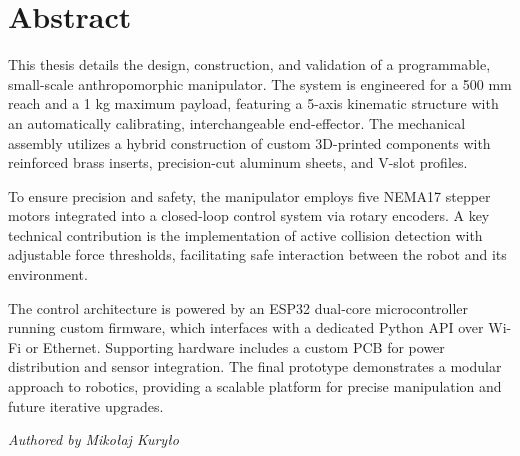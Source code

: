 \documentclass[10pt]{article}
\begin{document}
\section*{Abstract} %
This thesis details the design, construction, and validation of a programmable, small-scale anthropomorphic manipulator. The system is engineered for a 500 mm reach and a 1 kg maximum payload, featuring a 5-axis kinematic structure with an automatically calibrating, interchangeable end-effector. The mechanical assembly utilizes a hybrid construction of custom 3D-printed components with reinforced brass inserts, precision-cut aluminum sheets, and V-slot profiles.
\smallskip\par
To ensure precision and safety, the manipulator employs five NEMA17 stepper motors integrated into a closed-loop control system via rotary encoders. A key technical contribution is the implementation of active collision detection with adjustable force thresholds, facilitating safe interaction between the robot and its environment.
\smallskip\par
The control architecture is powered by an ESP32 dual-core microcontroller running custom firmware, which interfaces with a dedicated Python API over Wi-Fi or Ethernet. Supporting hardware includes a custom PCB for power distribution and sensor integration. The final prototype demonstrates a modular approach to robotics, providing a scalable platform for precise manipulation and future iterative upgrades.
\smallskip\par
\begin{flushright}\textit{Authored by Mikołaj Kuryło}\end{flushright}
\newpage


\renewcommand*\contentsname{Table of Contents}
\tableofcontents
\newpage
\end{document}
